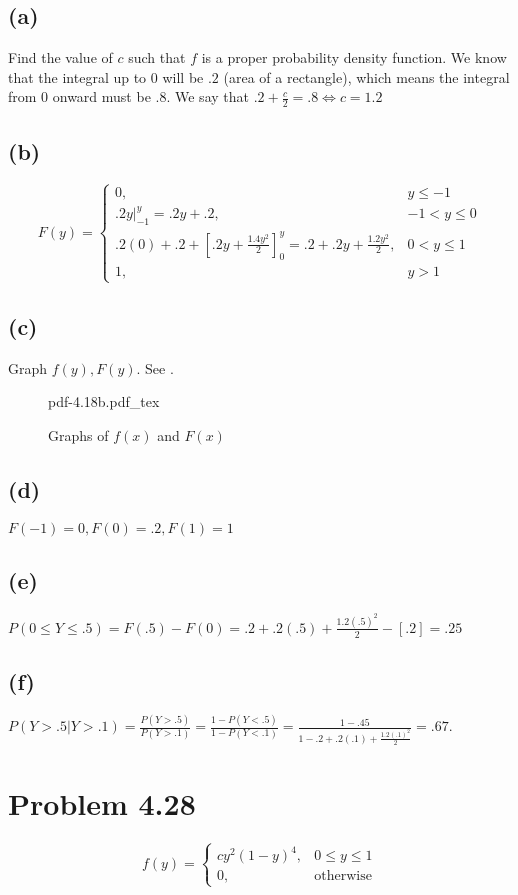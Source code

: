 \documentclass{article}
\theoremstyle{definition}
\begin{document}
    \subsection*{(a)}
        Find the value of $c$ such that $f$ is a proper probability density function. We know that the integral
        up to $0$ will be $.2$ (area of a rectangle), which means the integral from 0 onward must be $.8$.
        We say that $.2 + \frac{c}{2} = .8 \Leftrightarrow c = 1.2$
    \subsection*{(b)}
        \[
            F(y) = 
            \begin{cases}
                0, & y \leq -1\\
                .2y|_{-1}^y = .2y + .2, & -1 < y \leq 0\\
                .2(0) + .2 + \left[.2y + \frac{1.4y^2}{2}\right]_0^y = .2 + .2y + \frac{1.2y^2}{2}, & 0 < y \leq 1\\
                1, & y > 1
            \end{cases}
        \]
    \subsection*{(c)}
        Graph $f(y), F(y)$. See .
        \begin{figure}[ht]
            \centering
            \def\svgwidth{.5\linewidth}
            {pdf-4.18b.pdf_tex}
            \caption{Graphs of $f(x)$ and $F(x)$}
            \label{fig:pdf-4.18b}
        \end{figure}
    \subsection*{(d)}
        $F(-1) = 0, F(0) = .2, F(1) = 1$
    \subsection*{(e)}
        $P(0 \leq Y \leq .5) = F(.5) - F(0) = .2 + .2(.5) + \frac{1.2(.5)^2}{2} - [.2] = .25$
    \subsection*{(f)}
        $P(Y > .5 | Y > .1) = \frac{P(Y > .5)}{P(Y > .1)} = \frac{1 - P(Y < .5)}{1 - P(Y < .1)} = \frac{1 - .45}{1 -.2 + .2(.1) + \frac{1.2(.1)^2}{2}} = .67$.
\section*{Problem 4.28}
    \[
        f(y) =
        \begin{cases}
            cy^2 (1-y)^4, & 0 \leq y \leq 1\\
            0, & \text{otherwise}
        \end{cases}
    \]
\end{document}
